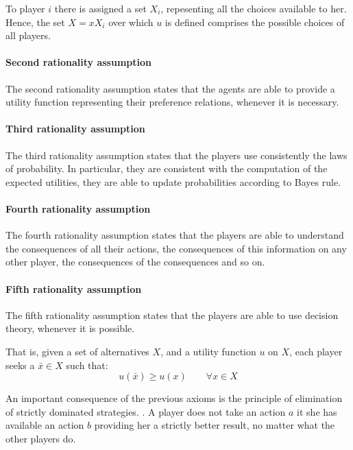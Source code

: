 To player $i$ there is assigned a set $X_i$, repesenting all the choices available to her.
Hence, the set $X=xX_i$ over which $u$ is defined comprises the possible choices of all players. 

\paragraph*{Second rationality assumption}
The second rationality assumption states that the agents are able to provide a utility function representing their preference relations, whenever it is necessary. 

\paragraph*{Third rationality assumption}
The third rationality assumption states that the players use consistently the laws of probability. 
In particular, they are consistent with the computation of the expected utilities, they are able to update probabilities according to Bayes rule. 

\paragraph*{Fourth rationality assumption}
The fourth rationality assumption states that the players are able to understand the consequences of all their actions, the consequences of this information on any other player, the consequences of the consequences and so on.

\paragraph*{Fifth rationality assumption}
The fifth rationality assumption states that the players are able to use decision theory, whenever it is possible.

That is, given a set of alternatives $X$, and a utility function $u$ on $X$, each player  seeks a $\bar{x}\in X$ such that: 
\[u(\bar{x}) \geq u(x)\qquad\forall x \in X\]

An important consequence of the previous axioms is the principle of elimination of strictly dominated strategies. . 
A player does not take an action $a$ it she has available an action $b$ providing her a strictly better result, no matter what the other players do.










